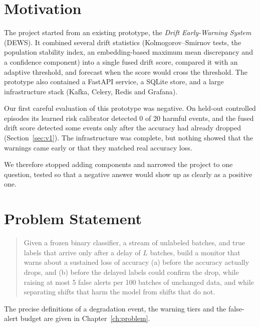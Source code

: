 \section{Motivation}
The project started from an existing prototype, the \emph{Drift Early-Warning System} (DEWS). It combined several drift statistics (Kolmogorov--Smirnov tests, the population stability index, an embedding-based maximum mean discrepancy and a confidence component) into a single fused drift score, compared it with an adaptive threshold, and forecast when the score would cross the threshold. The prototype also contained a FastAPI service, a SQLite store, and a large infrastructure stack (Kafka, Celery, Redis and Grafana).

Our first careful evaluation of this prototype was negative. On held-out controlled episodes its learned risk calibrator detected 0 of 20 harmful events, and the fused drift score detected some events only after the accuracy had already dropped (Section~\ref{sec:v1}). The infrastructure was complete, but nothing showed that the warnings came early or that they matched real accuracy loss.

We therefore stopped adding components and narrowed the project to one question, tested so that a negative answer would show up as clearly as a positive one.

\section{Problem Statement}
\begin{quote}
Given a frozen binary classifier, a stream of unlabeled batches, and true labels that arrive only after a delay of $L$ batches, build a monitor that warns about a sustained loss of accuracy (a) before the accuracy actually drops, and (b) before the delayed labels could confirm the drop, while raising at most 5 false alerts per 100 batches of unchanged data, and while separating shifts that harm the model from shifts that do not.
\end{quote}
The precise definitions of a degradation event, the warning tiers and the false-alert budget are given in Chapter~\ref{ch:problem}.

